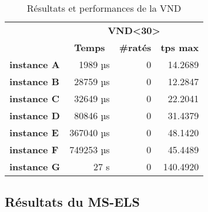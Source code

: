         \begin{table}[H]
            \centering
            \begin{tabular}{l|r|r|r|}
            \cline{2-4}
            \multirow{2}{*}{}                         & \multicolumn{3}{c|}{\textbf{VND\textless30\textgreater}}                                                            \\ \cline{2-4} 
                                                      & \multicolumn{1}{c|}{\textbf{Temps}} & \multicolumn{1}{c|}{\textbf{\#ratés}} & \multicolumn{1}{c|}{\textbf{tps max}} \\ \hline
            \multicolumn{1}{|l|}{\textbf{instance A}} & 1989 µs                             & 0                                     & 14.2689                               \\ \hline
            \multicolumn{1}{|l|}{\textbf{instance B}} & 28759 µs                            & 0                                     & 12.2847                               \\ \hline
            \multicolumn{1}{|l|}{\textbf{instance C}} & 32649 µs                            & 0                                     & 22.2041                               \\ \hline
            \multicolumn{1}{|l|}{\textbf{instance D}} & 80846 µs                            & 0                                     & 31.4379                               \\ \hline
            \multicolumn{1}{|l|}{\textbf{instance E}} & 367040 µs                           & 0                                     & 48.1420                               \\ \hline
            \multicolumn{1}{|l|}{\textbf{instance F}} & 749253 µs                           & 0                                     & 45.4489                               \\ \hline
            \multicolumn{1}{|l|}{\textbf{instance G}} & 27 s                               & 0                                     & 140.4920                                       \\ \hline
            \end{tabular}
            \caption{Résultats et performances de la VND}
            \label{tab:vnd-perf}
        \end{table}

    	\subsection{Résultats du MS-ELS}
    	
